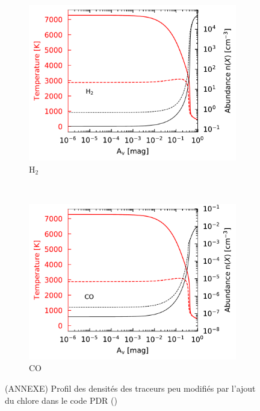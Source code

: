 \begin{figure}[!htbp]
    \begin{subfigure}[t]{0.49\textwidth} %
        \centering \includegraphics[trim = {0 0 0 0},clip,width=1\textwidth]{figure/Cl/gridModelEmiss/nT_comp_H2.pdf}
        \caption{$\mathrm{H}_2$}
    \end{subfigure}
    ~ 
    \begin{subfigure}[t]{0.49\textwidth} %
        \centering \includegraphics[trim = {0 0 0 0},clip,width=1\textwidth]{figure/Cl/gridModelEmiss/nT_comp_CO.pdf}
        \caption{$\mathrm{CO}$}
    \end{subfigure}
    
    \caption{(ANNEXE) Profil des densités des traceurs peu modifiés par l'ajout du chlore dans le code PDR (\uncinq)}
    \label{fig:Cl:gridModelEmiss:nT:no}
\end{figure}

